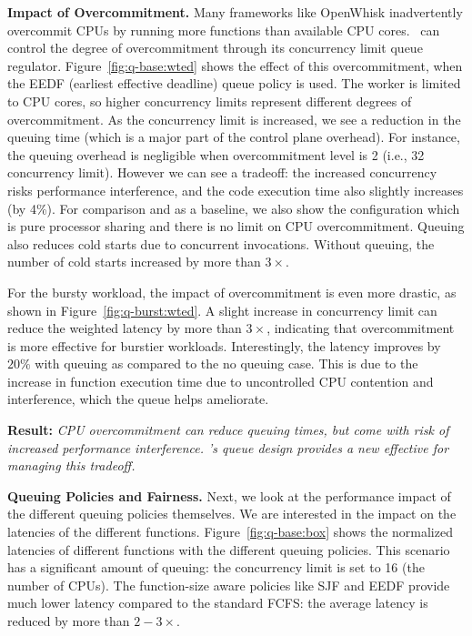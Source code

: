 \noindent \textbf{Impact of Overcommitment.}
Many frameworks like OpenWhisk inadvertently overcommit CPUs by running more functions than available CPU cores.
\sysname~can control the degree of overcommitment through its concurrency limit queue regulator.
Figure~\ref{fig:q-base:wted} shows the effect of this overcommitment, when the EEDF (earliest effective deadline) queue policy is used. 
The worker is limited to CPU cores, so higher concurrency limits represent different degrees of overcommitment. 
As the concurrency limit is increased, we see a reduction in the queuing time (which is a major part of the control plane overhead).
For instance, the queuing overhead is negligible when overcommitment level is 2 (i.e., 32 concurrency limit).
However we can see a tradeoff: the increased concurrency risks performance interference, and the code execution time also slightly increases (by 4\%).
For comparison and as a baseline, we also show the  configuration which is pure processor sharing and there is no limit on CPU overcommitment.
%
Queuing also reduces cold starts due to concurrent invocations. 
Without queuing, the number of cold starts increased by more than $3\times$. 

For the bursty workload, the impact of overcommitment is even more drastic, as shown in Figure~\ref{fig:q-burst:wted}.
A slight increase in concurrency limit can reduce the weighted latency by more than $3\times$, indicating that overcommitment is more effective for burstier workloads.
Interestingly, the latency improves by $20\%$ with queuing as compared to the  no queuing case.
This is due to the increase in function execution time due to uncontrolled CPU contention and interference, which the queue helps ameliorate. 

\noindent \textbf{Result:} \emph{CPU overcommitment can reduce queuing times, but come with risk of increased performance interference. \sysname's queue design provides a new effective  for managing this tradeoff.}


\noindent \textbf{Queuing Policies and Fairness.}
Next, we look at the performance impact of the different queuing policies themselves.
We are interested in the impact on the latencies of the different functions. 
Figure~\ref{fig:q-base:box} shows the normalized latencies of different functions with the different queuing policies.
This scenario has a significant amount of queuing: the concurrency limit is set to 16 (the number of CPUs). 
The function-size aware policies like SJF and EEDF provide much lower latency compared to the standard FCFS: the average latency is reduced by more than $2-3\times$. %

